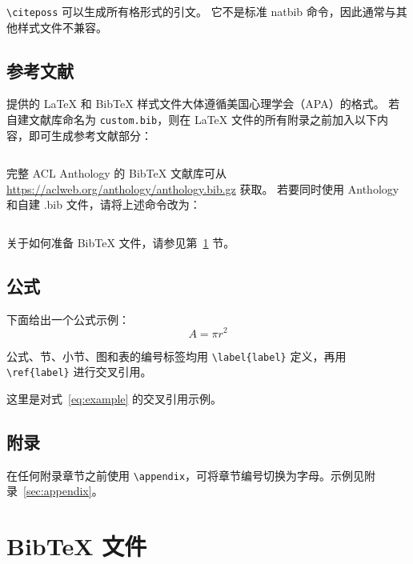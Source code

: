 \documentclass[11pt]{article}
\begin{document}
\verb|\citeposs| 可以生成所有格形式的引文。
它不是标准 natbib 命令，因此通常与其他样式文件不兼容。

\subsection{参考文献}

\nocite{Ando2005,andrew2007scalable,rasooli-tetrault-2015}

提供的 \LaTeX{} 和 Bib\TeX{} 样式文件大体遵循美国心理学会（APA）的格式。
若自建文献库命名为 \texttt{custom.bib}，则在 \LaTeX{} 文件的所有附录之前加入以下内容，即可生成参考文献部分：
\begin{quote}
\begin{verbatim}

\end{verbatim}
\end{quote}

完整 ACL Anthology 的 Bib\TeX{} 文献库可从 \url{https://aclweb.org/anthology/anthology.bib.gz} 获取。
若要同时使用 Anthology 和自建 .bib 文件，请将上述命令改为：
\begin{quote}
\begin{verbatim}

\end{verbatim}
\end{quote}

关于如何准备 Bib\TeX{} 文件，请参见第~\ref{sec:bibtex} 节。

\subsection{公式}

下面给出一个公式示例：
\begin{equation}
  \label{eq:example}
  A = \pi r^2
\end{equation}

公式、节、小节、图和表的编号标签均用 \verb|\label{label}| 定义，再用 \verb|\ref{label}| 进行交叉引用。

这里是对式~\ref{eq:example} 的交叉引用示例。

\subsection{附录}

在任何附录章节之前使用 \verb|\appendix|，可将章节编号切换为字母。示例见附录~\ref{sec:appendix}。

\section{Bib\TeX{} 文件}
\label{sec:bibtex}
\end{document}
